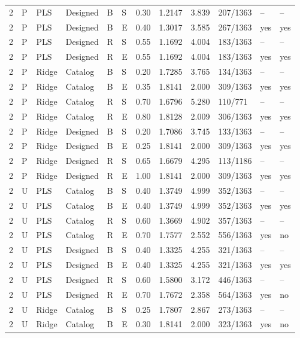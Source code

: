 \documentclass[10pt,a4paper]{article}
\begin{document}
\begin{longtable}{rlllllrrrlll}
2 & P & PLS & Designed & B & S & 0.30 & 1.2147 & 3.839 & 207/1363 & -- & -- \\
2 & P & PLS & Designed & B & E & 0.40 & 1.3017 & 3.585 & 267/1363 & yes & yes \\
2 & P & PLS & Designed & R & S & 0.55 & 1.1692 & 4.004 & 183/1363 & -- & -- \\
2 & P & PLS & Designed & R & E & 0.55 & 1.1692 & 4.004 & 183/1363 & yes & yes \\
2 & P & Ridge & Catalog & B & S & 0.20 & 1.7285 & 3.765 & 134/1363 & -- & -- \\
2 & P & Ridge & Catalog & B & E & 0.35 & 1.8141 & 2.000 & 309/1363 & yes & yes \\
2 & P & Ridge & Catalog & R & S & 0.70 & 1.6796 & 5.280 & 110/771 & -- & -- \\
2 & P & Ridge & Catalog & R & E & 0.80 & 1.8128 & 2.009 & 306/1363 & yes & yes \\
2 & P & Ridge & Designed & B & S & 0.20 & 1.7086 & 3.745 & 133/1363 & -- & -- \\
2 & P & Ridge & Designed & B & E & 0.25 & 1.8141 & 2.000 & 309/1363 & yes & yes \\
2 & P & Ridge & Designed & R & S & 0.65 & 1.6679 & 4.295 & 113/1186 & -- & -- \\
2 & P & Ridge & Designed & R & E & 1.00 & 1.8141 & 2.000 & 309/1363 & yes & yes \\
2 & U & PLS & Catalog & B & S & 0.40 & 1.3749 & 4.999 & 352/1363 & -- & -- \\
2 & U & PLS & Catalog & B & E & 0.40 & 1.3749 & 4.999 & 352/1363 & yes & yes \\
2 & U & PLS & Catalog & R & S & 0.60 & 1.3669 & 4.902 & 357/1363 & -- & -- \\
2 & U & PLS & Catalog & R & E & 0.70 & 1.7577 & 2.552 & 556/1363 & yes & no \\
2 & U & PLS & Designed & B & S & 0.40 & 1.3325 & 4.255 & 321/1363 & -- & -- \\
2 & U & PLS & Designed & B & E & 0.40 & 1.3325 & 4.255 & 321/1363 & yes & yes \\
2 & U & PLS & Designed & R & S & 0.60 & 1.5800 & 3.172 & 446/1363 & -- & -- \\
2 & U & PLS & Designed & R & E & 0.70 & 1.7672 & 2.358 & 564/1363 & yes & no \\
2 & U & Ridge & Catalog & B & S & 0.25 & 1.7807 & 2.867 & 273/1363 & -- & -- \\
2 & U & Ridge & Catalog & B & E & 0.30 & 1.8141 & 2.000 & 323/1363 & yes & no \\

\end{longtable}
\end{document}
